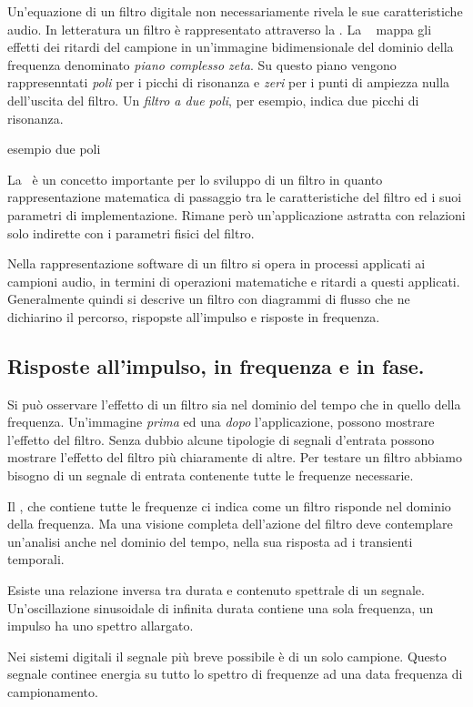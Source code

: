 Un'equazione di un filtro digitale non necessariamente rivela le sue caratteristiche
audio. In letteratura un filtro è rappresentato attraverso la \tz.
La \tz~ mappa gli effetti dei ritardi del campione in un'immagine
bidimensionale del dominio della frequenza denominato \emph{piano complesso zeta}.
Su questo piano vengono rappresenntati \emph{poli} per i picchi di risonanza e
\emph{zeri} per i punti di ampiezza nulla dell'uscita del filtro. Un \emph{filtro
a due poli}, per esempio, indica due picchi di risonanza.

esempio due poli

La \tz~è un concetto importante per lo sviluppo di un filtro in quanto rappresentazione
matematica di passaggio tra le caratteristiche del filtro ed i suoi parametri di
implementazione. Rimane però un'applicazione astratta con relazioni solo indirette
con i parametri fisici del filtro.

Nella rappresentazione software di un filtro si opera in processi applicati
ai campioni audio, in termini di operazioni matematiche e ritardi a questi applicati.
Generalmente quindi si descrive un filtro con diagrammi di flusso che ne dichiarino
il percorso, rispopste all'impulso e risposte in frequenza.

\subsection{Risposte all'impulso, in frequenza e in fase.}

Si può osservare l'effetto di un filtro sia nel dominio del tempo che in quello
della frequenza. Un'immagine \emph{prima} ed una \emph{dopo} l'applicazione, possono
mostrare l'effetto del filtro. Senza dubbio alcune tipologie di segnali d'entrata
possono mostrare l'effetto del filtro più chiaramente di altre. Per testare un
filtro abbiamo bisogno di un segnale di entrata contenente tutte le frequenze necessarie.

Il \rb, che contiene tutte le frequenze ci indica come un filtro risponde nel dominio
della frequenza. Ma una visione completa dell'azione del filtro deve contemplare
un'analisi anche nel dominio del tempo, nella sua risposta ad i transienti temporali.

Esiste una relazione inversa tra durata e contenuto spettrale di un segnale.
Un'oscillazione sinusoidale di infinita durata contiene una sola frequenza, un
impulso ha uno spettro allargato.

Nei sistemi digitali il segnale più breve possibile è di un solo campione. Questo
segnale continee energia su tutto lo spettro di frequenze ad una data frequenza
di campionamento.


